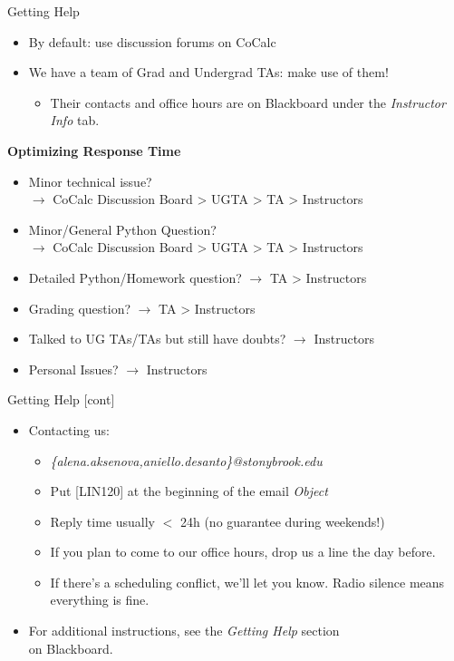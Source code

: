 \documentclass[professionalfonts, xcolor={usenames,svgnames,x11names,table}]{beamer}
\begin{document}
\begin{frame}{Getting Help}
    \begin{itemize}
        \item By default: use discussion forums on CoCalc
        \item We have a team of Grad and Undergrad TAs: make use of them!
            \begin{itemize}
            \item Their contacts and office hours are on Blackboard under the \textit{Instructor Info} tab.
             \end{itemize}
\end{itemize}

 \textbf{Optimizing Response Time}
  \begin{itemize}
        \item Minor technical issue? \\ $\rightarrow$ CoCalc Discussion Board > UGTA > TA > Instructors
         \item Minor/General Python Question?  \\ $\rightarrow$   CoCalc Discussion Board > UGTA > TA > Instructors
         \item Detailed Python/Homework question?  $\rightarrow$ TA > Instructors
         \item Grading question? $\rightarrow$  TA > Instructors
         \item Talked to UG TAs/TAs but still have doubts? $\rightarrow$ Instructors
         \item Personal Issues?  $\rightarrow$ Instructors
    \end{itemize}
    \end{frame}
             
 \begin{frame}{Getting Help [cont]}      
   \begin{itemize}      
        \item Contacting us:
            \begin{itemize}
                \item \textit{\{alena.aksenova,aniello.desanto\}@stonybrook.edu}
                \item Put [LIN120] at the beginning of the email \textit{Object}
                \item Reply time usually $<$ 24h (no guarantee during weekends!)
                \item If you plan to come to our office hours, drop us a line 
                    the day before.
                     \item  If there's a scheduling conflict, we'll let you know.
                    Radio silence means everything is fine.
            \end{itemize}
        \item For additional instructions, see the \emph{Getting Help} section\\
            on Blackboard.
    \end{itemize}
\end{frame}
\end{document}
